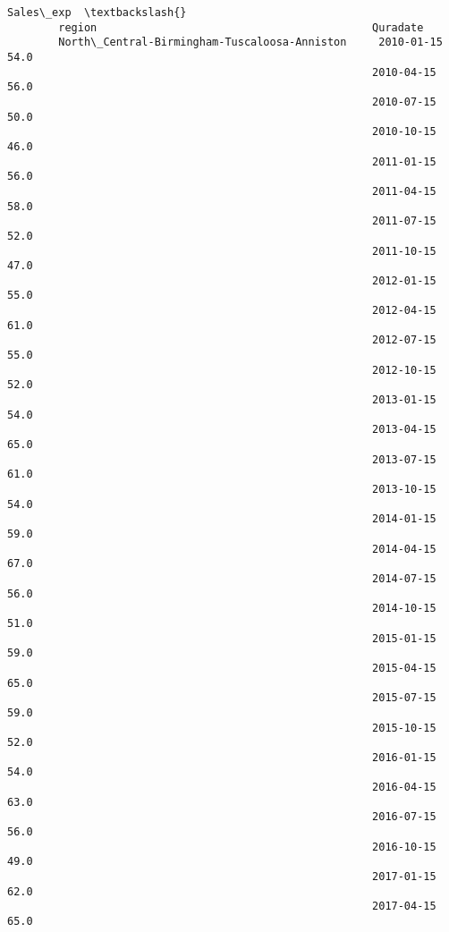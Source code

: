 \documentclass[11pt]{article}
\begin{document}
\begin{Verbatim}[commandchars=\\\{\}]
                                                                     Sales\_exp  \textbackslash{}
        region                                           Quradate                
        North\_Central-Birmingham-Tuscaloosa-Anniston     2010-01-15       54.0   
                                                         2010-04-15       56.0   
                                                         2010-07-15       50.0   
                                                         2010-10-15       46.0   
                                                         2011-01-15       56.0   
                                                         2011-04-15       58.0   
                                                         2011-07-15       52.0   
                                                         2011-10-15       47.0   
                                                         2012-01-15       55.0   
                                                         2012-04-15       61.0   
                                                         2012-07-15       55.0   
                                                         2012-10-15       52.0   
                                                         2013-01-15       54.0   
                                                         2013-04-15       65.0   
                                                         2013-07-15       61.0   
                                                         2013-10-15       54.0   
                                                         2014-01-15       59.0   
                                                         2014-04-15       67.0   
                                                         2014-07-15       56.0   
                                                         2014-10-15       51.0   
                                                         2015-01-15       59.0   
                                                         2015-04-15       65.0   
                                                         2015-07-15       59.0   
                                                         2015-10-15       52.0   
                                                         2016-01-15       54.0   
                                                         2016-04-15       63.0   
                                                         2016-07-15       56.0   
                                                         2016-10-15       49.0   
                                                         2017-01-15       62.0   
                                                         2017-04-15       65.0   

\end{Verbatim}
\end{document}
